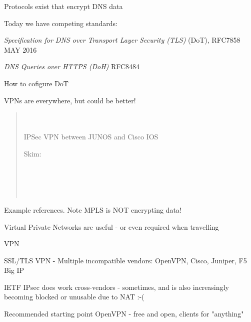 \documentclass[Screen16to9,17pt]{foils}
\begin{document}
\begin{list2}
\item Protocols exist that encrypt DNS data
\item Today we have competing standards:
\item
\emph{Specification for DNS over Transport Layer Security (TLS)} (DoT), RFC7858 MAY 2016\\

\item \emph{DNS Queries over HTTPS (DoH)} RFC8484

\item How to cofigure DoT\\ 
\end{list2}




VPNs are everywhere, but could be better!

\begin{quote}
\\
\\
IPSec VPN between JUNOS and Cisco IOS

Skim:\\
\\
\\
\\
\\
\end{quote}

Example references. Note MPLS is NOT encrypting data!




\begin{list1}
\item Virtual Private Networks are useful - or even required when travelling
\item VPN 
\item SSL/TLS VPN - Multiple incompatible vendors: OpenVPN, Cisco, Juniper, F5 Big IP
\item IETF IPsec does work cross-vendors - sometimes, and is also increasingly becoming blocked or unusable due to NAT :-(
\item Recommended starting point OpenVPN - free and open, clients for "anything"
\end{list1}
\end{document}
